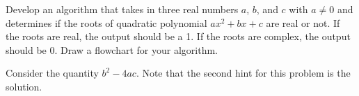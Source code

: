 \documentclass{ximera}
\begin{document}
\begin{question}
	Develop an algorithm that takes in three real numbers $a$, $b$, and $c$ with $a\neq 0$ and determines if the roots of quadratic polynomial $ax^2+bx+c$ are real or not. If the roots are real, the output should be a 1. If the roots are complex, the output should be 0. Draw a flowchart for your algorithm.
	\begin{hint}
		Consider the quantity $b^2-4ac$. Note that the second hint for this problem is the solution.
	\end{hint}
	
	\begin{hint}
		\begin{center}
		\end{center}
	\end{hint}
\end{question}
\end{document}
